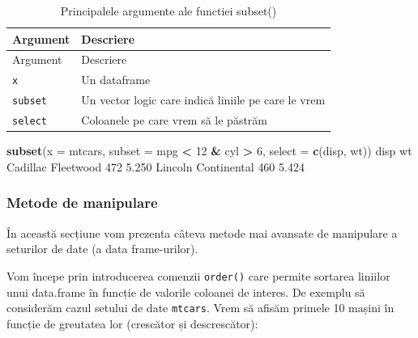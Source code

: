 \documentclass[]{article}
\newenvironment{Shaded}{\begin{snugshade}}{\end{snugshade}}
\newcommand{\KeywordTok}[1]{\textcolor[rgb]{0.13,0.29,0.53}{\textbf{#1}}}
\newcommand{\DataTypeTok}[1]{\textcolor[rgb]{0.13,0.29,0.53}{#1}}
\newcommand{\DecValTok}[1]{\textcolor[rgb]{0.00,0.00,0.81}{#1}}
\newcommand{\FloatTok}[1]{\textcolor[rgb]{0.00,0.00,0.81}{#1}}
\newcommand{\StringTok}[1]{\textcolor[rgb]{0.31,0.60,0.02}{#1}}
\newcommand{\OperatorTok}[1]{\textcolor[rgb]{0.81,0.36,0.00}{\textbf{#1}}}
\newcommand{\NormalTok}[1]{#1}
\begin{document}
\begin{longtable}[]{@{}ll@{}}
\caption{Principalele argumente ale functiei subset()}\tabularnewline
\toprule
Argument & Descriere\tabularnewline
\midrule
\endfirsthead
\toprule
Argument & Descriere\tabularnewline
\midrule
\endhead
\texttt{x} & Un dataframe\tabularnewline
\texttt{subset} & Un vector logic care indică liniile pe care le
vrem\tabularnewline
\texttt{select} & Coloanele pe care vrem să le păstrăm\tabularnewline
\bottomrule
\end{longtable}

\begin{Shaded}
\begin{Highlighting}[]
\KeywordTok{subset}\NormalTok{(}\DataTypeTok{x =}\NormalTok{ mtcars,}
      \DataTypeTok{subset =}\NormalTok{ mpg }\OperatorTok{<}\StringTok{ }\DecValTok{12} \OperatorTok{&}
\StringTok{               }\NormalTok{cyl }\OperatorTok{>}\StringTok{ }\DecValTok{6}\NormalTok{,}
      \DataTypeTok{select =} \KeywordTok{c}\NormalTok{(disp, wt))}
\NormalTok{                    disp    wt}
\NormalTok{Cadillac Fleetwood   }\DecValTok{472} \FloatTok{5.250}
\NormalTok{Lincoln Continental  }\DecValTok{460} \FloatTok{5.424}
\end{Highlighting}
\end{Shaded}

\subsubsection{Metode de manipulare}\label{metode-de-manipulare}

În această secțiune vom prezenta câteva metode mai avansate de
manipulare a seturilor de date (a data frame-urilor).

Vom începe prin introducerea comenzii \texttt{order()} care permite
sortarea liniilor unui data.frame în funcție de valorile coloanei de
interes. De exemplu să considerăm cazul setului de date \texttt{mtcars}.
Vrem să afisăm primele 10 mașini în funcție de greutatea lor (crescător
și descrescător):
\end{document}
